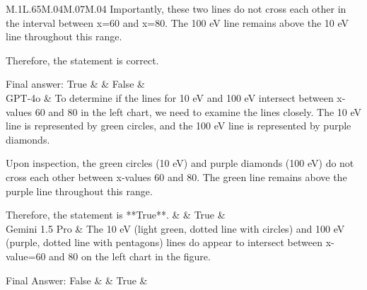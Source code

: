 \begin{table*}[t]
\begin{tabular}{M{.1\linewidth}L{.65\linewidth}M{.04\linewidth}M{.07\linewidth}M{.04\linewidth}}
Importantly, these two lines do not cross each other in the interval between x=60 and x=80. The 100 eV line remains above the 10 eV line throughout this range.

Therefore, the statement is correct.

Final answer: True & \xmark & False & \cmark \\
\midrule
GPT-4o & To determine if the lines for 10 eV and 100 eV intersect between x-values 60 and 80 in the left chart, we need to examine the lines closely. The 10 eV line is represented by green circles, and the 100 eV line is represented by purple diamonds. 

Upon inspection, the green circles (10 eV) and purple diamonds (100 eV) do not cross each other between x-values 60 and 80. The green line remains above the purple line throughout this range.

Therefore, the statement is **True**. & \xmark & True & \xmark \\
\midrule
Gemini 1.5 Pro & The 10 eV (light green, dotted line with circles) and 100 eV (purple, dotted line with pentagons) lines do appear to intersect between x-value=60 and 80 on the left chart in the figure. 

Final Answer: False & \cmark & True & \xmark \\
\bottomrule
    \end{tabular}
    \caption{Examples of dataset and model responses for \texttt{Charts-Intersection} (1)} \label{tab:examples_Charts-Intersection_1}%
\end{table*}
%
%
%
\clearpage
%
%
%
